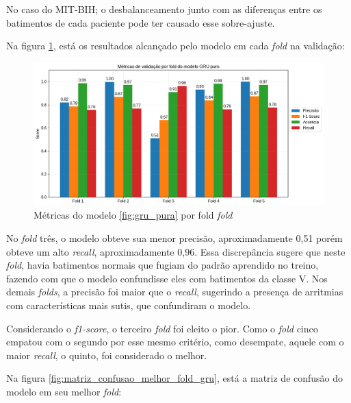 \documentclass[
    12pt,                %
    openright,           %
    oneside,             %
    a4paper,             %
    brazil               %
]{abntex2}
\begin{document}
No caso do MIT-BIH; o desbalanceamento junto com as diferenças entre os batimentos de cada paciente pode ter causado esse sobre-ajuste.

Na figura \ref{fig:gru_resultados_por_fold}, está os resultados alcançado pelo modelo em cada \textit{fold} na validação:

\begin{figure}[H]
  \centering
   \includegraphics[width=1.0\textwidth]{figuras/modelos_resultados/gru/gru_metricas_por_fold.png} %
  \caption{Métricas do modelo \ref{fig:gru_pura} por fold \textit{fold}}
  \label{fig:gru_resultados_por_fold}
\end{figure}

No \textit{fold} três, o modelo obteve sua menor precisão, aproximadamente 0,51 porém obteve um alto \textit{recall}, aproximadamente 0,96.
Essa discrepância sugere que neste \textit{fold}, havia batimentos normais que fugiam do padrão aprendido no treino, fazendo com que o modelo
confundisse eles com batimentos da classe V. Nos demais \textit{folds}, a precisão foi maior que o \textit{recall}, sugerindo a presença 
de arritmias com características mais sutis, que confundiram o modelo.

Considerando o \textit{f1-score}, o terceiro \textit{fold} foi eleito o pior. Como o \textit{fold} cinco empatou com o segundo por 
esse mesmo critério, como desempate, aquele com o maior \textit{recall}, o quinto, foi considerado o melhor. 

Na figura \ref{fig:matriz_confusao_melhor_fold_gru}, está a matriz de  confusão do modelo em seu melhor \textit{fold}:
\end{document}

